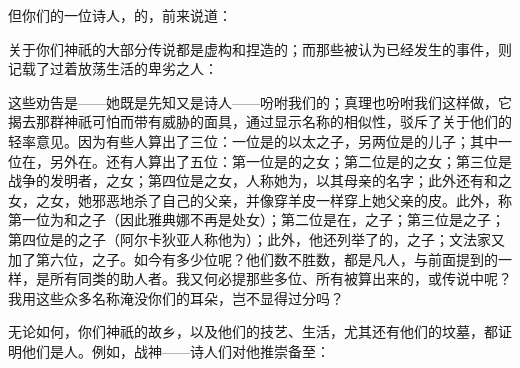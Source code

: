 但你们的一位诗人，的，前来说道：\par

\par

关于你们神祇的大部分传说都是虚构和捏造的；而那些被认为已经发生的事件，则记载了过着放荡生活的卑劣之人：\par

\par

这些劝告是——她既是先知又是诗人——吩咐我们的；真理也吩咐我们这样做，它揭去那群神祇可怕而带有威胁的面具，通过显示名称的相似性，驳斥了关于他们的轻率意见。因为有些人算出了三位：一位是的以太之子，另两位是的儿子；其中一位在，另外在。还有人算出了五位：第一位是的之女；第二位是的之女；第三位是战争的发明者，之女；第四位是之女，人称她为，以其母亲的名字；此外还有和之女，之女，她邪恶地杀了自己的父亲，并像穿羊皮一样穿上她父亲的皮。此外，称第一位为和之子（因此雅典娜不再是处女）；第二位是在，之子；第三位是之子；第四位是的之子（阿尔卡狄亚人称他为）；此外，他还列举了的，之子；文法家又加了第六位，之子。如今有多少位呢？他们数不胜数，都是凡人，与前面提到的一样，是所有同类的助人者。我又何必提那些多位、所有被算出来的，或传说中呢？我用这些众多名称淹没你们的耳朵，岂不显得过分吗？\par

无论如何，你们神祇的故乡，以及他们的技艺、生活，尤其还有他们的坟墓，都证明他们是人。例如，战神——诗人们对他推崇备至：\par

